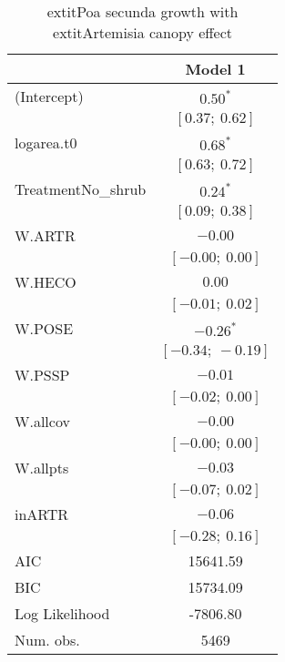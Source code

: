 \begin{table}
\caption{	extit{Poa secunda} growth with 	extit{Artemisia} canopy effect}
\begin{center}
\begin{tabular}{l c }
\hline
 & Model 1 \\
\hline
(Intercept)                      & $0.50^{*}$        \\
                                 & $[0.37;\ 0.62]$   \\
logarea.t0                       & $0.68^{*}$        \\
                                 & $[0.63;\ 0.72]$   \\
TreatmentNo\_shrub               & $0.24^{*}$        \\
                                 & $[0.09;\ 0.38]$   \\
W.ARTR                           & $-0.00$           \\
                                 & $[-0.00;\ 0.00]$  \\
W.HECO                           & $0.00$            \\
                                 & $[-0.01;\ 0.02]$  \\
W.POSE                           & $-0.26^{*}$       \\
                                 & $[-0.34;\ -0.19]$ \\
W.PSSP                           & $-0.01$           \\
                                 & $[-0.02;\ 0.00]$  \\
W.allcov                         & $-0.00$           \\
                                 & $[-0.00;\ 0.00]$  \\
W.allpts                         & $-0.03$           \\
                                 & $[-0.07;\ 0.02]$  \\
inARTR                           & $-0.06$           \\
                                 & $[-0.28;\ 0.16]$  \\
\hline
AIC                              & 15641.59          \\
BIC                              & 15734.09          \\
Log Likelihood                   & -7806.80          \\
Num. obs.                        & 5469              \\

\end{tabular}
\end{center}
\end{table}
